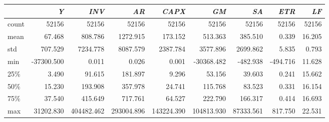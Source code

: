 \begin{threeparttable}  

\begin{tabular}{lrrrrrrrr}
\toprule
    {} & \textit{Y} & \textit{INV} & \textit{AR} & \textit{CAPX} & \textit{GM} & \textit{SA} & \textit{ETR} & \textit{LF} \\
\midrule
count &  52156 &   52156 &   52156 &   52156 &   52156 &  52156 &  52156 &  52156 \\
mean  &     67.468 &     808.786 &    1272.915 &     173.152 &     513.363 &    385.510 &      0.339 &     16.205 \\
std   &    707.529 &    7234.778 &    8087.579 &    2387.784 &    3577.896 &   2699.862 &      5.835 &      0.793 \\
min   & -37300.500 &       0.011 &       0.026 &       0.001 &  -30368.482 &   -482.938 &   -494.716 &     11.628 \\
25\%   &      3.490 &      91.615 &     181.897 &       9.296 &      53.156 &     39.603 &      0.241 &     15.662 \\
50\%   &     15.230 &     193.908 &     357.978 &      24.741 &     115.768 &     83.523 &      0.331 &     16.154 \\
75\%   &     37.540 &     415.649 &     717.761 &      64.527 &     222.790 &    166.317 &      0.414 &     16.693 \\
max   &  31202.830 &  404482.462 &  293004.896 &  143224.390 &  104813.930 &  87333.561 &    817.750 &     22.531 \\
\bottomrule
\end{tabular}


\end{threeparttable}
